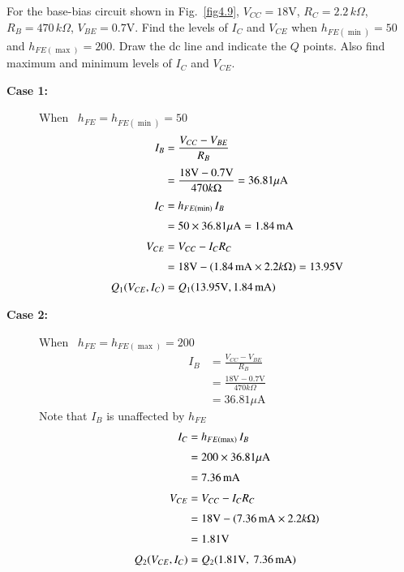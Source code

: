 \begin{example}\label{exam4.4}
For the base-bias circuit shown in Fig.~\ref{fig4.9}, $V_{CC}=18\text{V}$, $R_{C}=2.2\, k\Omega$, $R_{B}=470\, k\Omega$, $V_{BE}=0.7\text{V}$. Find the levels of $I_{C}$ and $V_{CE}$ when $h_{FE(\min)}=50$ and $h_{FE(\max)}=200$. Draw the dc line and indicate the $Q$ points. Also find maximum and minimum levels of $I_{C}$ and $V_{CE}$.
\end{example}

\eject

\begin{solution}
\begin{description}
\item[{\bf Case 1:}] When \ $h_{FE}=h_{FE(\min)}=50$
\begin{align*}
I_{B} &= \frac{V_{CC}-V_{BE}}{R_{B}}\\[3pt]
&= \frac{18\text{V}-0.7\text{V}}{470 k\Omega}=36.81\mu \text{A}\\[3pt]
I_{C} &= h_{FE(\min)}\,I_{B}\\[3pt]
&= 50\times 36.81\mu\text{A}=1.84\text{\,mA}\\[3pt]
V_{CE} &= V_{CC}-I_{C}R_{C}\\[3pt]
&= 18\text{V}-(1.84\text{\,mA}\times 2.2 k\Omega)=13.95\text{V}\\[3pt]
Q_{1}(V_{CE},I_{C}) &= Q_{1}(13.95\text{V},1.84\text{\,mA})
\end{align*}

\item[{\bf Case 2:}] When \ $h_{FE}=h_{FE(\max)} =200$
\begin{align*}
I_{B}&= \frac{V_{CC}-V_{BE}}{R_{B}}\\[3pt]
&= \frac{18\text{V}-0.7\text{V}}{470 k\Omega}\\[3pt]
&= 36.81\mu\text{A}
\end{align*}
Note that $I_{B}$ is unaffected by $h_{FE}$
\begin{align*}
I_{C} &= h_{FE(\max)}\,I_{B}\\[3pt]
&= 200\times 36.81\mu\text{A}\\[3pt]
&= 7.36\text{\,mA}\\[3pt]
V_{CE} &= V_{CC}-I_{C}R_{C}\\[3pt]
&= 18\text{V}-(7.36\text{\,mA}\times 2.2 k\Omega)\\[3pt]
&= 1.81\text{V}\\[3pt]
Q_{2}(V_{CE},I_{C}) &= Q_{2}(1.81\text{V}, \ 7.36\text{\,mA})
\end{align*}


\end{description}
\end{solution}
